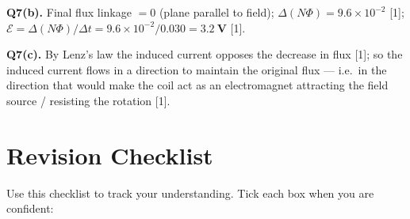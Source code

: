 \begin{markscheme}
\vspace{0.5em}\textbf{Q7(b).} Final flux linkage $= 0$ (plane parallel to field); $\Delta(N\Phi) = 9.6\times10^{-2}$ [1]; $\mathcal{E} = \Delta(N\Phi)/\Delta t = 9.6\times10^{-2}/0.030 = \mathbf{3.2\ \text{V}}$ [1].

\vspace{0.5em}\textbf{Q7(c).} By Lenz's law the induced current opposes the decrease in flux [1]; so the induced current flows in a direction to maintain the original flux — i.e.\ in the direction that would make the coil act as an electromagnet attracting the field source / resisting the rotation [1].

\end{markscheme}

\newpage
\section{Revision Checklist}

Use this checklist to track your understanding. Tick each box when you are confident:

